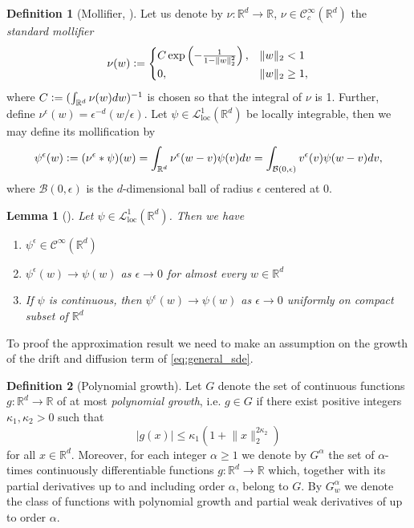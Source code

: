 \documentclass[12pt]{article}
\newtheorem{lemma}[lemma]{Lemma}
\theoremstyle{definition}
\newtheorem{definition}[definition]{Definition}
\numberwithin{equation}{section}
\newcommand{\R}{\mathbb{R}}
\newcommand{\CL}{\mathcal{L}}
\newcommand{\CC}{\mathcal{C}}
\newcommand{\CB}{\mathcal{B}}
\newcommand{\norm}[1]{\lVert{#1}\rVert_2}
\newcommand{\defeq}{\vcentcolon=}
\begin{document}
\begin{definition}[Mollifier, ]
  Let us denote by $\nu : \R^d \rightarrow \R$, $\nu \in \CC^{\infty}_c(\R^d)$ the \emph{standard mollifier}
  \begin{equation*}
    \nu(w) \defeq \begin{cases}
      C \exp\left(-\frac{1}{1 - \norm{w}^2}\right), &\norm{w} < 1 \\
      0, &\norm{w} \geq 1,
    \end{cases}
  \end{equation*}
  where $C \defeq (\int_{\R^d}\nu(w)dw)^{-1}$ is chosen so that the integral of $\nu$ is 1. Further, define $\nu^{\epsilon}(w) = \epsilon^{-d}(w/\epsilon)$. Let $\psi \in \CL^1_{\text{loc}}(\R^d)$ be locally integrable, then we may define its mollification by
  \begin{equation*}
    \psi^{\epsilon}(w) \defeq (\nu^{\epsilon}*\psi)(w) = \int_{\R^d}\nu^{\epsilon}(w-v)\psi(v)dv = \int_{\CB(0,\epsilon)}v^{\epsilon}(v)\psi(w-v)dv,
  \end{equation*}
  where $\CB(0,\epsilon)$ is the $d$-dimensional ball of radius $\epsilon$ centered at 0. 
\end{definition}
\begin{lemma}[]
  \label{lemma:mollifiers}
  Let $\psi \in \CL^1_{\text{loc}}(\R^d)$. Then we have
  \begin{enumerate}[label=(\roman*)]
    \item $\psi^{\epsilon} \in \CC^{\infty}(\R^d)$
    \item $\psi^{\epsilon}(w) \rightarrow \psi(w)$ as $\epsilon \rightarrow 0$ for almost every $w \in \R^d$
    \item If $\psi$ is continuous, then $\psi^{\epsilon}(w) \rightarrow \psi(w)$ as $\epsilon \rightarrow 0$ uniformly on compact subset of $\R^d$
  \end{enumerate}
\end{lemma}
To proof the approximation result we need to make an assumption on the growth of the drift and diffusion term of \eqref{eq:general_sde}. 
\begin{definition}[Polynomial growth]
  Let $G$ denote the set of continuous functions $g : \R^d \rightarrow \R$ of at most \emph{polynomial growth}, i.e. $g \in G$ if there exist positive integers $\kappa_1, \kappa_2 > 0$ such that
  \begin{equation*}
    |g(x)| \leq \kappa_1(1 + \norm{x}^{2\kappa_2})
  \end{equation*} 
  for all $x \in \R^d$. Moreover, for each integer $\alpha \geq 1$ we denote by $G^{\alpha}$ the set of $\alpha$-times continuously differentiable functions $g : \R^d \rightarrow \R$ which, together with its partial derivatives up to and including order $\alpha$, belong to $G$. By $G^{\alpha}_w$ we denote the class of functions with polynomial growth and partial weak derivatives of up to order $\alpha$. 
\end{definition}
\end{document}
